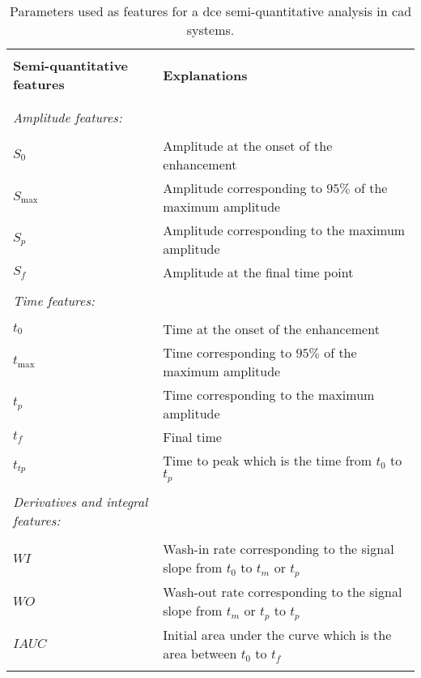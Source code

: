 \begin{table*}
  \caption{Parameters used as features for a \ac{dce} semi-quantitative analysis in \ac{cad} systems.}\label{tab:semiqua}
  \small
  \renewcommand{\arraystretch}{.8}
  \begin{tabular}{p{.35\linewidth} p{.60\linewidth}}
    \hline \\ [-1.5ex]
    \textbf{Semi-quantitative features} & \textbf{Explanations} \\ \\ [-1.5ex]
    \hline \\ [-1.5ex]
    \textit{Amplitude features:} & \\ \\ [-1.5ex]
    \quad $S_0$ & Amplitude at the onset of the enhancement \\
    \quad $S_{\max}$ & Amplitude corresponding to $95\%$ of the maximum amplitude \\
    \quad $S_{p}$ & Amplitude corresponding to the maximum amplitude \\
    \quad $S_f$ & Amplitude at the final time point \\ \\ [-1.5ex]
    \textit{Time features:} & \\ \\ [-1.5ex]
    \quad $t_0$ & Time at the onset of the enhancement \\
    \quad $t_{\max}$ & Time corresponding to $95\%$ of the maximum amplitude \\
    \quad $t_{p}$ & Time corresponding to the maximum amplitude \\
    \quad $t_{f}$ & Final time \\
    \quad $t_{tp}$ & Time to peak which is the time from $t_0$ to $t_p$ \\ \\ [-1.5ex]
    \textit{Derivatives and integral features:} & \\ \\ [-1.5ex]
    \quad $WI$ & Wash-in rate corresponding to the signal slope from $t_0$ to $t_m$ or $t_p$ \\
    \quad $WO$ & Wash-out rate corresponding to the signal slope from $t_m$ or $t_p$ to $t_p$ \\
    \quad $IAUC$ & Initial area under the curve which is the area between $t_0$ to $t_{f}$ \\ \\ [-1.5ex]
    \hline
  \end{tabular}
\end{table*}

